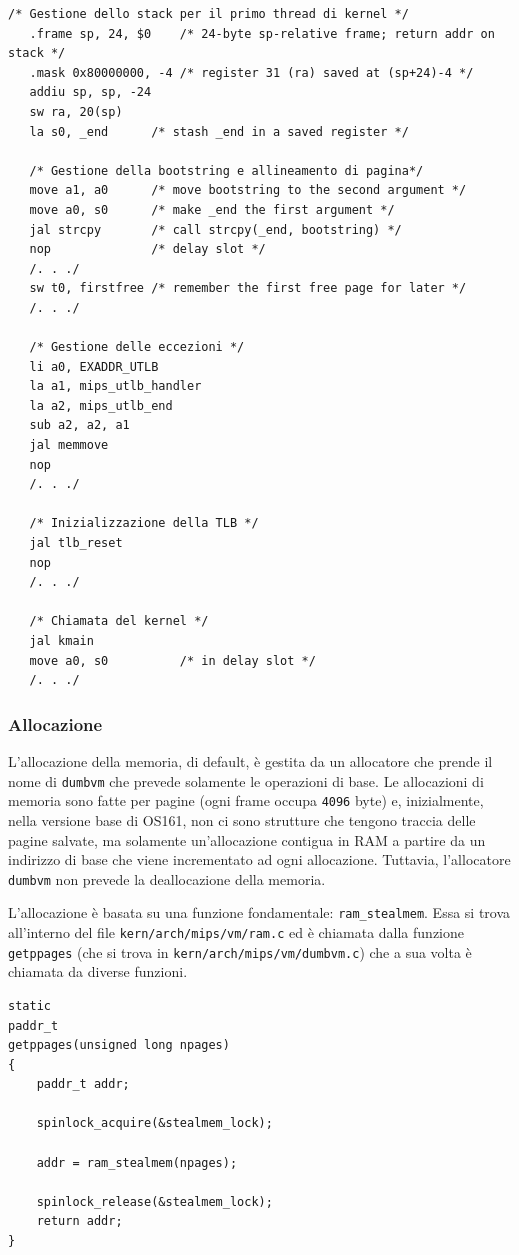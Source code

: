 \begin{lstlisting}[caption=Parte del codice di avviamento del kernel]
    /* Gestione dello stack per il primo thread di kernel */
   .frame sp, 24, $0	/* 24-byte sp-relative frame; return addr on stack */
   .mask 0x80000000, -4	/* register 31 (ra) saved at (sp+24)-4 */
   addiu sp, sp, -24
   sw ra, 20(sp)
   la s0, _end		/* stash _end in a saved register */

   /* Gestione della bootstring e allineamento di pagina*/
   move a1, a0		/* move bootstring to the second argument */
   move a0, s0		/* make _end the first argument */
   jal strcpy		/* call strcpy(_end, bootstring) */
   nop			    /* delay slot */
   /. . ./
   sw t0, firstfree	/* remember the first free page for later */
   /. . ./
   
   /* Gestione delle eccezioni */
   li a0, EXADDR_UTLB
   la a1, mips_utlb_handler
   la a2, mips_utlb_end
   sub a2, a2, a1
   jal memmove
   nop
   /. . ./
   
   /* Inizializzazione della TLB */
   jal tlb_reset
   nop
   /. . ./
   
   /* Chiamata del kernel */
   jal kmain
   move a0, s0			/* in delay slot */
   /. . ./
\end{lstlisting}

\subsubsection{Allocazione}
L'allocazione della memoria, di default, è gestita da un allocatore che prende il nome di \lstinline{dumbvm} che prevede solamente le operazioni di base. Le allocazioni di memoria sono fatte per pagine (ogni frame occupa \lstinline{4096} byte) e, inizialmente, nella versione base di OS161, non ci sono strutture che tengono traccia delle pagine salvate, ma solamente un'allocazione contigua in RAM a partire da un indirizzo di base che viene incrementato ad ogni allocazione. Tuttavia, l'allocatore \lstinline{dumbvm} non prevede la deallocazione della memoria.

L'allocazione è basata su una funzione fondamentale: \lstinline{ram_stealmem}. Essa si trova all'interno del file \lstinline{kern/arch/mips/vm/ram.c} ed è chiamata dalla funzione \lstinline{getppages} (che si trova in \lstinline{kern/arch/mips/vm/dumbvm.c}) che a sua volta è chiamata da diverse funzioni.

\begin{lstlisting}[caption={\lstinline{getppages} in \lstinline{ram.c}}]
static
paddr_t
getppages(unsigned long npages)
{
	paddr_t addr;

	spinlock_acquire(&stealmem_lock);

	addr = ram_stealmem(npages);

	spinlock_release(&stealmem_lock);
	return addr;
}
\end{lstlisting}

